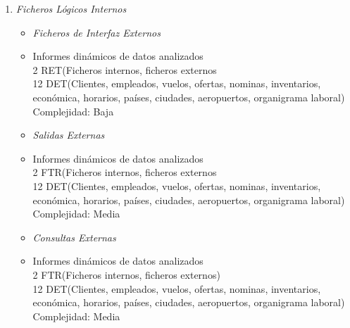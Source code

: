 
\begin{enumerate}
	\item \textit{Ficheros Lógicos Internos}
	\begin{itemize}
	\item \textit{Ficheros de Interfaz Externos}
		\item Informes dinámicos de datos analizados \\
			2 RET(Ficheros internos, ficheros externos \\
			12 DET(Clientes, empleados, vuelos, ofertas, nominas, inventarios, económica, horarios, países, ciudades, aeropuertos, organigrama laboral) \\
			Complejidad: Baja\\

	\end{itemize}
	
	
	\begin{itemize}
	\item \textit{Salidas Externas}
		\item Informes dinámicos de datos analizados \\
			2 FTR(Ficheros internos, ficheros externos \\
			12 DET(Clientes, empleados, vuelos, ofertas, nominas, inventarios, económica, horarios, países, ciudades, aeropuertos, organigrama laboral) \\
			Complejidad: Media\\
	\end{itemize}
	\begin{itemize}
	\item \textit{Consultas Externas}
		\item Informes dinámicos de datos analizados \\
			2 FTR(Ficheros internos, ficheros externos) \\
			12 DET(Clientes, empleados, vuelos, ofertas, nominas, inventarios, económica, horarios, países, ciudades, aeropuertos, organigrama laboral) \\
			Complejidad: Media\\
		
	\end{itemize}		
\end{enumerate}
